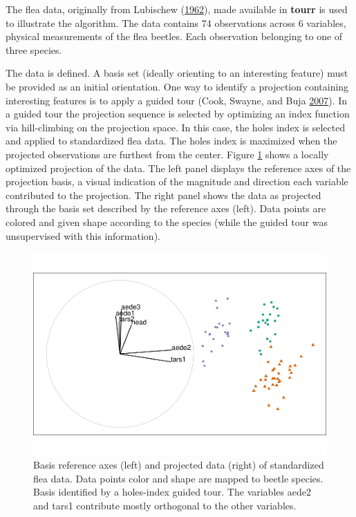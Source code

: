 The flea data, originally from Lubischew
(\protect\hyperlink{ref-lubischew_use_1962}{1962}), made available in
\textbf{tourr} is used to illustrate the algorithm. The data contains 74
observations across 6 variables, physical measurements of the flea
beetles. Each observation belonging to one of three species.

The data is defined. A basis set (ideally orienting to an interesting
feature) must be provided as an initial orientation. One way to identify
a projection containing interesting features is to apply a guided tour
(Cook, Swayne, and Buja
\protect\hyperlink{ref-cook_interactive_2007}{2007}). In a guided tour
the projection sequence is selected by optimizing an index function via
hill-climbing on the projection space. In this case, the holes index is
selected and applied to standardized flea data. The holes index is
maximized when the projected observations are furthest from the center.
Figure \ref{fig:step0} shows a locally optimized projection of the data.
The left panel displays the reference axes of the projection basis, a
visual indication of the magnitude and direction each variable
contributed to the projection. The right panel shows the data as
projected through the basis set described by the reference axes (left).
Data points are colored and given shape according to the species (while
the guided tour was unsupervised with this information).

\begin{Schunk}
\begin{figure}

{\centering \includegraphics[width=0.6\linewidth]{spinifex_paper_files/figure-latex/step0-1} 

}

\caption[Basis reference axes (left) and projected data (right) of standardized flea data]{Basis reference axes (left) and projected data (right) of standardized flea data. Data points color and shape are mapped to beetle species. Basis identified by a holes-index guided tour. The variables aede2 and tars1 contribute mostly orthogonal to the other variables.}\label{fig:step0}
\end{figure}
\end{Schunk}


